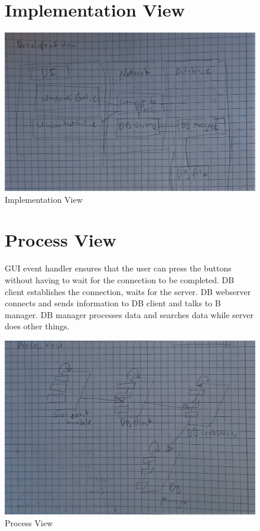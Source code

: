 \begin{figure}[hbt]
\section{Implementation View}
  \includegraphics[width=\textwidth]{Immagini/IMG_20230604_171802.jpg}
  \caption{Implementation View}
\end{figure}

\begin{figure}[hbt]
\section{Process View}
GUI event handler ensures that the user can press the buttons without having to wait for the connection to be completed. DB client establishes the connection, waits for the server. DB webserver connects and sends information to DB client and talks to B manager. DB manager processes data and searches data while server does other things.

  \includegraphics[width=\textwidth]{Immagini/IMG_20230604dhjj_171802.jpg}
  \caption{Process View}
\end{figure}

